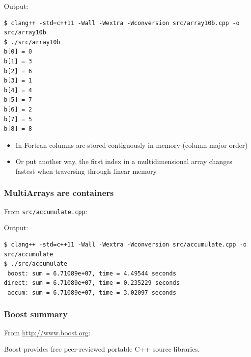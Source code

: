 \documentclass[12pt,letterpaper,twoside]{article}
\begin{document}
Output:

\begin{verbatim}
$ clang++ -std=c++11 -Wall -Wextra -Wconversion src/array10b.cpp -o src/array10b
$ ./src/array10b
b[0] = 0
b[1] = 3
b[2] = 6
b[3] = 1
b[4] = 4
b[5] = 7
b[6] = 2
b[7] = 5
b[8] = 8
\end{verbatim}

\begin{itemize}
\item
  In Fortran columns are stored contiguously in memory (column major
  order)
\item
  Or put another way, the first index in a multidimensional array
  changes fastest when traversing through linear memory
\end{itemize}

\hypertarget{multiarrays-are-containers}{%
\subsubsection{MultiArrays are
containers}\label{multiarrays-are-containers}}

From \texttt{src/accumulate.cpp}:

\begin{Shaded}
\begin{Highlighting}[]
  \NormalTok{ (} 
\NormalTok{);}
\NormalTok{  \}}
\end{Highlighting}
\end{Shaded}

Output:

\begin{verbatim}
$ clang++ -std=c++11 -Wall -Wextra -Wconversion src/accumulate.cpp -o src/accumulate
$ ./src/accumulate
 boost: sum = 6.71089e+07, time = 4.49544 seconds
direct: sum = 6.71089e+07, time = 0.235229 seconds
 accum: sum = 6.71089e+07, time = 3.02097 seconds
\end{verbatim}

\hypertarget{boost-summary}{%
\subsubsection{Boost summary}\label{boost-summary}}

From \url{http://www.boost.org}:

Boost provides free peer-reviewed portable C++ source libraries.
\end{document}
